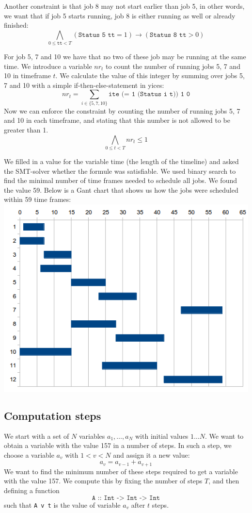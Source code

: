 \documentclass[12pt]{article}
\begin{document}
Another constraint is that job 8 may not start earlier than job 5, in other words, we want that if job 5 starts running, job 8 is either running as well or already finished:
\[ \bigwedge_{0 \le \texttt{tt} < T} (\texttt{Status 5 tt} = 1) \rightarrow (\texttt{Status 8 tt} > 0) \]

For job 5, 7 and 10 we have that no two of these job may be running at the same time. 
We introduce a variable $nr_t$ to count the number of running jobs 5, 7 and 10 in timeframe $t$.
We calculate the value of this integer by summing over jobs 5, 7 and 10 with a simple if-then-else-statement in yices: 
\[ nr_t = \sum_{i \in \{5,7,10\}} \texttt{ite (= 1 (Status i t)) 1 0} \]
Now we can enforce the constraint by counting the number of running jobs 5, 7 and 10 in each timeframe, 
and stating that this number is not allowed to be greater than 1. 
\[ \bigwedge_{0 \le t < T} nr_t \le 1\]

We filled in a value for the variable time (the length of the timeline) 
and asked the SMT-solver whether the formule was satisfiable. 
We used binary search to find the minimal number of time frames needed to schedule all jobs. 
We found the value 59. 
Below is a Gant chart that shows us how the jobs were scheduled within 59 time frames:
\includegraphics[width=15cm]{gantchart.png}

\subsection*{Computation steps}
We start with a set of $N$ variables $a_1, \dots, a_N$ with initial values $1 \dots N$.
We want to obtain a variable with the value 157 in a number of steps. 
In such a step, we choose a variable $a_v$ with $1 < v < N$ and assign it a new value:
\[ a_v = a_{v-1} + a_{v+1} \]
We want to find the minimum number of these steps required to get a variable with the value 157.
We compute this by fixing the number of steps $T$, and then defining a function
\[\texttt{A :: Int -> Int -> Int}\]
such that \texttt{A v t} is the value of variable $a_v$ after $t$ steps.
\end{document}
